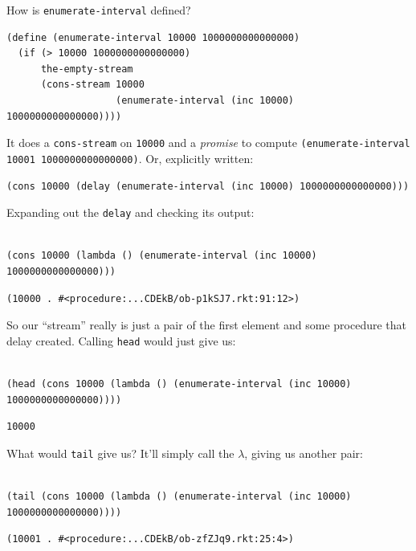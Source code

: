 \documentclass[9pt]{report}
\begin{document}
How is \texttt{enumerate-interval} defined?

\begin{verbatim}
(define (enumerate-interval 10000 1000000000000000)
  (if (> 10000 1000000000000000)
      the-empty-stream
      (cons-stream 10000
                   (enumerate-interval (inc 10000) 1000000000000000))))
\end{verbatim}

It does a \texttt{cons-stream} on \texttt{10000} and a \emph{promise} to compute
\texttt{(enumerate-interval 10001 1000000000000000)}. Or, explicitly
written:

\begin{verbatim}
(cons 10000 (delay (enumerate-interval (inc 10000) 1000000000000000)))
\end{verbatim}

Expanding out the \texttt{delay} and checking its output:
\begin{verbatim}

(cons 10000 (lambda () (enumerate-interval (inc 10000) 1000000000000000)))
\end{verbatim}

\begin{verbatim}
(10000 . #<procedure:...CDEkB/ob-p1kSJ7.rkt:91:12>)
\end{verbatim}


So our ``stream'' really is just a pair of the first element and some
procedure that delay created. Calling \texttt{head} would just give us:

\begin{verbatim}

(head (cons 10000 (lambda () (enumerate-interval (inc 10000) 1000000000000000))))
\end{verbatim}

\begin{verbatim}
10000
\end{verbatim}


What would \texttt{tail} give us? It'll simply call the \(\lambda\), giving us
another pair:

\begin{verbatim}

(tail (cons 10000 (lambda () (enumerate-interval (inc 10000) 1000000000000000))))
\end{verbatim}

\begin{verbatim}
(10001 . #<procedure:...CDEkB/ob-zfZJq9.rkt:25:4>)
\end{verbatim}
\end{document}
